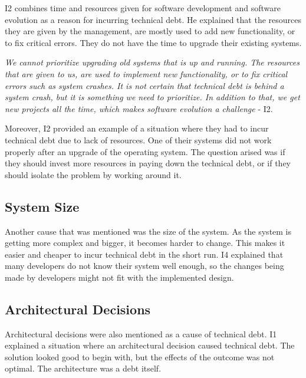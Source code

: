 I2 combines time and resources given for software development and software evolution as a reason for incurring technical debt. He explained that the resources they are given by the management, are mostly used to add new functionality, or to fix critical errors. They do not have the time to upgrade their existing systems.
\begin{displayquote}
\textit{We cannot prioritize upgrading old systems that is up and running. The resources that are given to us, are used to implement new functionality, or to fix critical errors such as system crashes. It is not certain that technical debt is behind a system crash, but it is something we need to prioritize. In addition to that, we get new projects all the time, which makes software evolution a challenge} - I2.
\end{displayquote} 
Moreover, I2 provided an example of a situation where they had to incur technical debt due to lack of resources. One of their systems did not work properly after an upgrade of the operating system. The question arised was if they should invest more resources in paying down the technical debt, or if they should isolate the problem by working around it.



\subsection{System Size}
Another cause that was mentioned was the size of the system. As the system is getting more complex and bigger, it becomes harder to change. This makes it easier and cheaper to incur technical debt in the short run. I4 explained that many developers do not know their system well enough, so the changes being made by developers might not fit with the implemented design.



\subsection{Architectural Decisions}
Architectural decisions were also mentioned as a cause of technical debt. I1 explained a situation where an architectural decision caused technical debt. The solution looked good to begin with, but the effects of the outcome was not optimal. The architecture was a debt itself. 



